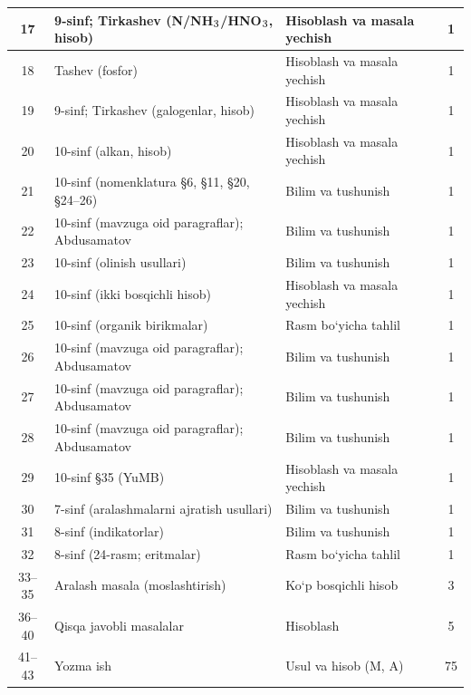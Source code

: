 \documentclass[11pt,a4paper]{article}
\renewcommand{\textsubscript}[1]{\ensuremath{_{\text{\fontsize{8}{8}\selectfont #1}}}}
\begin{document}
{\begin{longtable}{|c|p{7.2cm}|p{5.4cm}|c|}
17 & 9-sinf; Tirkashev (N/NH\textsubscript{3}/HNO\textsubscript{3}, hisob) & Hisoblash va masala yechish & 1\\\hline
18 & Tashev (fosfor) & Hisoblash va masala yechish & 1\\\hline
19 & 9-sinf; Tirkashev (galogenlar, hisob) & Hisoblash va masala yechish & 1\\\hline
20 & 10-sinf (alkan, hisob) & Hisoblash va masala yechish & 1\\\hline
21 & 10-sinf (nomenklatura \S{}6, \S{}11, \S{}20, \S{}24--26) & Bilim va tushunish & 1\\\hline
22 & 10-sinf (mavzuga oid paragraflar); Abdusamatov & Bilim va tushunish & 1\\\hline
23 & 10-sinf (olinish usullari) & Bilim va tushunish & 1\\\hline
24 & 10-sinf (ikki bosqichli hisob) & Hisoblash va masala yechish & 1\\\hline
25 & 10-sinf (organik birikmalar) & Rasm bo`yicha tahlil & 1\\\hline
26 & 10-sinf (mavzuga oid paragraflar); Abdusamatov & Bilim va tushunish & 1\\\hline
27 & 10-sinf (mavzuga oid paragraflar); Abdusamatov & Bilim va tushunish & 1\\\hline
28 & 10-sinf (mavzuga oid paragraflar); Abdusamatov & Bilim va tushunish & 1\\\hline
29 & 10-sinf \S{}35 (YuMB) & Hisoblash va masala yechish & 1\\\hline
30 & 7-sinf (aralashmalarni ajratish usullari) & Bilim va tushunish & 1\\\hline
31 & 8-sinf (indikatorlar) & Bilim va tushunish & 1\\\hline
32 & 8-sinf (24-rasm; eritmalar) & Rasm bo`yicha tahlil & 1\\\hline
33--35 & Aralash masala (moslashtirish) & Ko`p bosqichli hisob & 3\\\hline
36--40 & Qisqa javobli masalalar & Hisoblash & 5\\\hline
41--43 & Yozma ish & Usul va hisob (M, A) & 75\\\hline
\end{longtable}}
\end{document}
